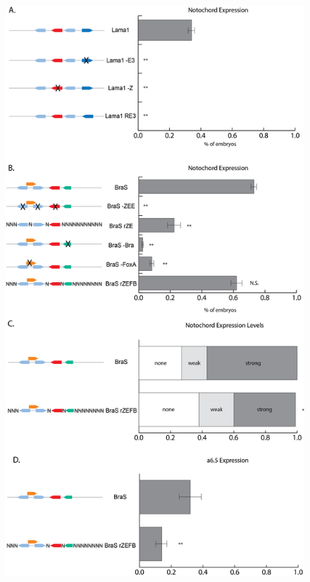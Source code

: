 \begin{figure}[p]
    \centering
    \includegraphics[scale=.25]{2_figures/FigS5_Notochord-Counting.png}

\end{figure}
